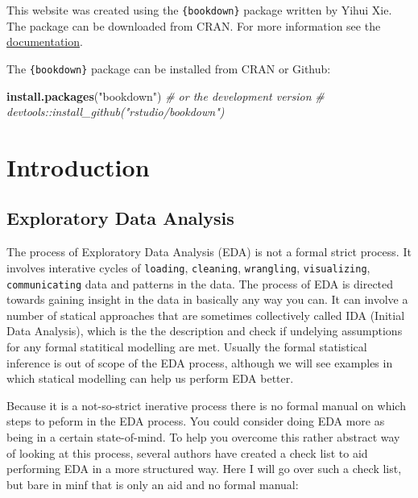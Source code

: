 \documentclass[]{book}
\newenvironment{Shaded}{\begin{snugshade}}{\end{snugshade}}
\newcommand{\CommentTok}[1]{\textcolor[rgb]{0.56,0.35,0.01}{\textit{#1}}}
\newcommand{\KeywordTok}[1]{\textcolor[rgb]{0.13,0.29,0.53}{\textbf{#1}}}
\newcommand{\NormalTok}[1]{#1}
\newcommand{\StringTok}[1]{\textcolor[rgb]{0.31,0.60,0.02}{#1}}
\begin{document}
This website was created using the \texttt{\{bookdown\}} package written by Yihui Xie. The package can be downloaded from CRAN. For more information see the \href{https://bookdown.org/yihui/bookdown/}{documentation}.

The \texttt{\{bookdown\}} package can be installed from CRAN or Github:

\begin{Shaded}
\begin{Highlighting}[]
\KeywordTok{install.packages}\NormalTok{(}\StringTok{"bookdown"}\NormalTok{)}
\CommentTok{# or the development version}
\CommentTok{# devtools::install_github("rstudio/bookdown")}
\end{Highlighting}
\end{Shaded}

\hypertarget{intro}{%
\chapter{Introduction}\label{intro}}

\hypertarget{exploratory-data-analysis}{%
\section{Exploratory Data Analysis}\label{exploratory-data-analysis}}

The process of Exploratory Data Analysis (EDA) is not a formal strict process. It involves interative cycles of \texttt{loading}, \texttt{cleaning}, \texttt{wrangling}, \texttt{visualizing}, \texttt{communicating} data and patterns in the data. The process of EDA is directed towards gaining insight in the data in basically any way you can. It can involve a number of statical approaches that are sometimes collectively called IDA (Initial Data Analysis), which is the the description and check if undelying assumptions for any formal statitical modelling are met. Usually the formal statistical inference is out of scope of the EDA process, although we will see examples in which statical modelling can help us perform EDA better.

Because it is a not-so-strict inerative process there is no formal manual on which steps to peform in the EDA process. You could consider doing EDA more as being in a certain state-of-mind. To help you overcome this rather abstract way of looking at this process, several authors have created a check list to aid performing EDA in a more structured way. Here I will go over such a check list, but bare in minf that is only an aid and no formal manual:
\end{document}
